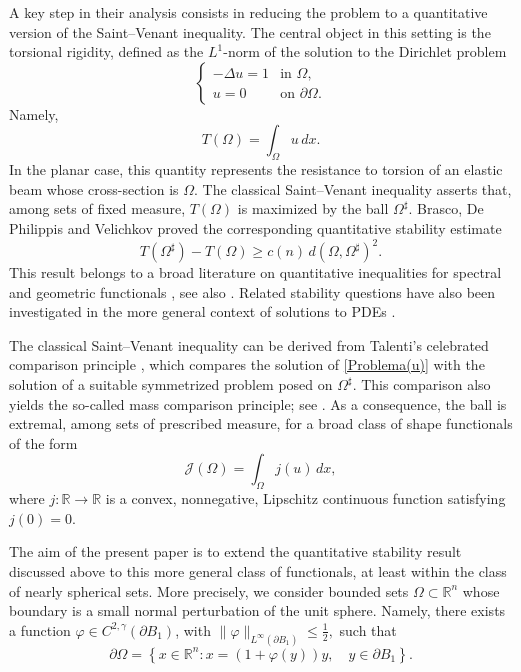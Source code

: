 \documentclass[oneside,a4paper,11pt,notitlepage]{article}
\theoremstyle{definition}
\theoremstyle{plain}
\theoremstyle{definition}
\begin{document}
A key step in their analysis consists in reducing the problem to a quantitative version of the Saint--Venant inequality. The central object in this setting is the torsional rigidity, defined as the $L^1$-norm of the solution to the Dirichlet problem
\begin{equation}\label{Problema(u)}
    \begin{cases}
        -\Delta u=1 & \text{in } \Omega,\\
        u=0 & \text{on } \partial\Omega.
    \end{cases}
\end{equation}
Namely,
\[
    T(\Omega)=\int_\Omega u\,dx.
\]
In the planar case, this quantity represents the resistance to torsion of an elastic beam whose cross-section is $\Omega$. The classical Saint--Venant inequality asserts that, among sets of fixed measure, $T(\Omega)$ is maximized by the ball $\Omega^\sharp$. Brasco, De Philippis and Velichkov proved the corresponding quantitative stability estimate
\begin{equation*}
    T(\Omega^\sharp)-T(\Omega)\geq c(n)\, d(\Omega,\Omega^\sharp)^2.
\end{equation*}
This result belongs to a broad literature on quantitative inequalities for spectral and geometric functionals \cite{AB2,BFNT,CCLMP,F}, see also \cite[Chapter 7]{H}. Related stability questions have also been investigated in the more general context of solutions to PDEs \cite{AL,AB,ABCMP,ABMP,MS}. 

The classical Saint--Venant inequality can be derived from Talenti's celebrated comparison principle \cite{T}, which compares the solution of \eqref{Problema(u)} with the solution of a suitable symmetrized problem posed on $\Omega^\sharp$. This comparison also yields the so-called mass comparison principle; see \cite{ALT}. As a consequence, the ball is extremal, among sets of prescribed measure, for a broad class of shape functionals of the form
\begin{equation*}
    \mathcal{J}(\Omega)=\int_\Omega j(u)\,dx,
\end{equation*}
where $j:\mathbb{R}\to\mathbb{R}$ is a convex, nonnegative, Lipschitz continuous function satisfying $j(0)=0$.

The aim of the present paper is to extend the quantitative stability result discussed above to this more general class of functionals, at least within the class of nearly spherical sets. More precisely, we consider bounded sets $\Omega\subset\mathbb{R}^n$ whose boundary is a small normal perturbation of the unit sphere. Namely, there exists a function $\varphi\in C^{2,\gamma}(\partial B_1)$, with $    \|\varphi\|_{L^\infty(\partial B_1)}\leq \frac12,
$ such that
\begin{equation*}
    \partial\Omega=\left\{ x\in\mathbb{R}^n :x=(1+\varphi(y))y,\quad y\in\partial B_1\right\}.
\end{equation*}
\end{document}
